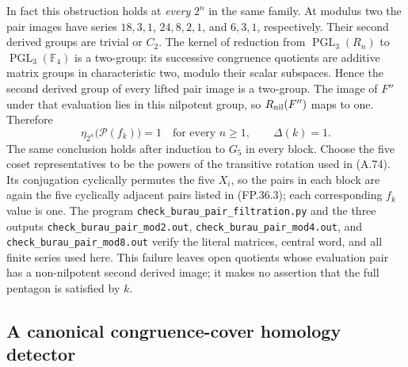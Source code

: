 In fact this obstruction holds at \emph{every} $2^n$ in the
same family. At modulus two the pair images have series
$18,3,1$, $24,8,2,1$, and $6,3,1$, respectively.
Their second derived groups are trivial or $C_2$. The kernel
of reduction from $\operatorname{PGL}_3(R_n)$ to
$\operatorname{PGL}_3(\mathbb F_4)$ is a two-group: its
successive congruence quotients are additive matrix groups in
characteristic two, modulo their scalar subspaces. Hence the
second derived group of every lifted pair image is a two-group.
The image of $F''$ under that evaluation lies in this nilpotent
group, so $R_{\rm nil}(F'')$ maps to one. Therefore
\[
           \eta_{2^n}\bigl(\mathcal P(f_k)\bigr)=1
           \quad\text{for every }n\geq1,
           \qquad \Delta(k)=1.
 \tag{FP.36.4}
\]
The same conclusion holds after induction to $G_5$ in every
block. Choose the five coset representatives to be the powers
of the transitive rotation used in (A.74). Its conjugation
cyclically permutes the five $X_i$, so the pairs in each block
are again the five cyclically adjacent pairs listed in
(FP.36.3); each corresponding $f_k$ value is one.
The program \texttt{check\_burau\_pair\_filtration.py} and
the three outputs \texttt{check\_burau\_pair\_mod2.out},
\texttt{check\_burau\_pair\_mod4.out}, and
\texttt{check\_burau\_pair\_mod8.out} verify the literal
matrices, central word, and all finite series used here.
This failure leaves open quotients whose evaluation pair has a
non-nilpotent second derived image; it makes no assertion that
the full pentagon is satisfied by $k$.

\subsection{A canonical congruence-cover homology detector}



